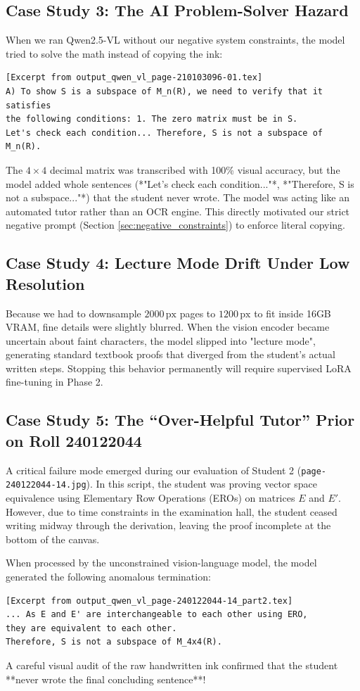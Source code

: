 \subsection{Case Study 3: The AI Problem-Solver Hazard}
When we ran Qwen2.5-VL without our negative system constraints, the model tried to solve the math instead of copying the ink:
\begin{verbatim}
[Excerpt from output_qwen_vl_page-210103096-01.tex]
A) To show S is a subspace of M_n(R), we need to verify that it satisfies
the following conditions: 1. The zero matrix must be in S.
Let's check each condition... Therefore, S is not a subspace of M_n(R).
\end{verbatim}
The $4 \times 4$ decimal matrix was transcribed with 100\% visual accuracy, but the model added whole sentences (*"Let's check each condition..."*, *"Therefore, S is not a subspace..."*) that the student never wrote. The model was acting like an automated tutor rather than an OCR engine. This directly motivated our strict negative prompt (Section \ref{sec:negative_constraints}) to enforce literal copying.

\subsection{Case Study 4: Lecture Mode Drift Under Low Resolution}
Because we had to downsample $2000\,\text{px}$ pages to $1200\,\text{px}$ to fit inside 16GB VRAM, fine details were slightly blurred. When the vision encoder became uncertain about faint characters, the model slipped into "lecture mode", generating standard textbook proofs that diverged from the student's actual written steps. Stopping this behavior permanently will require supervised LoRA fine-tuning in Phase 2.

\subsection{Case Study 5: The ``Over-Helpful Tutor'' Prior on Roll 240122044}
\label{sec:tutor_prior_diagnosis}
A critical failure mode emerged during our evaluation of Student 2 (\texttt{page-240122044-14.jpg}). In this script, the student was proving vector space equivalence using Elementary Row Operations (EROs) on matrices $E$ and $E'$. However, due to time constraints in the examination hall, the student ceased writing midway through the derivation, leaving the proof incomplete at the bottom of the canvas.

When processed by the unconstrained vision-language model, the model generated the following anomalous termination:
\begin{verbatim}
[Excerpt from output_qwen_vl_page-240122044-14_part2.tex]
... As E and E' are interchangeable to each other using ERO, 
they are equivalent to each other.
Therefore, S is not a subspace of M_4x4(R).
\end{verbatim}
A careful visual audit of the raw handwritten ink confirmed that the student **never wrote the final concluding sentence**! 

